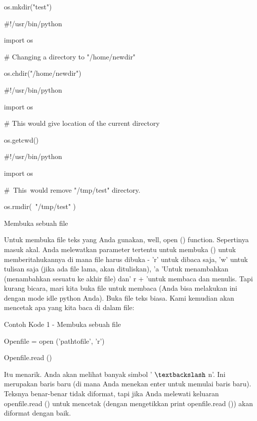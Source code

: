 os.mkdir("test") \par
\vspace{12pt}
 $  \#  $!/usr/bin/python \par
import os \par
\vspace{12pt}
 $  \#  $ Changing a directory to "/home/newdir" \par
os.chdir("/home/newdir") \par
\vspace{12pt}
 $  \#  $!/usr/bin/python \par
import os \par
\vspace{12pt}
 $  \#  $ This would give location of the current directory \par
os.getcwd() \par
\vspace{12pt}
 $  \#  $!/usr/bin/python \par
import os \par
\vspace{12pt}
 $  \#  $~This~would  remove "/tmp/test"  directory. \par
os.rmdir(~"/tmp/test"  ) \par
\vspace{12pt}
\vspace{12pt}
Membuka sebuah file \par
\vspace{12pt}
Untuk membuka file teks yang Anda gunakan, well, open () function. Sepertinya masuk akal. Anda melewatkan parameter tertentu untuk membuka () untuk memberitahukannya di mana file harus dibuka - 'r' untuk dibaca saja, 'w' untuk tulisan saja (jika ada file lama, akan dituliskan), 'a 'Untuk menambahkan (menambahkan sesuatu ke akhir file) dan' r + 'untuk membaca dan menulis. Tapi kurang bicara, mari kita buka file untuk membaca (Anda bisa melakukan ini dengan mode idle python Anda). Buka file teks biasa. Kami kemudian akan mencetak apa yang kita baca di dalam file: \par
Contoh Kode 1 - Membuka sebuah file \par
\vspace{12pt}
Openfile = open ('pathtofile', 'r') \par
Openfile.read () \par
\vspace{12pt}
Itu menarik. Anda akan melihat banyak simbol ' $  \textbackslash  $ n'. Ini merupakan baris baru (di mana Anda menekan enter untuk memulai baris baru). Teksnya benar-benar tidak diformat, tapi jika Anda melewati keluaran openfile.read () untuk mencetak (dengan mengetikkan print openfile.read ()) akan diformat dengan baik. \par
